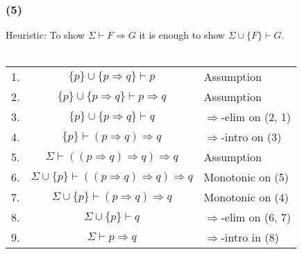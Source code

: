 \documentclass{article}
\begin{document}
\subsubsection*{(5)}
Heuristic: To show $\Sigma\vdash F\Rightarrow G$ it is enough to show $\Sigma\cup\{F\}\vdash G$.\\
\\
\begin{tabular}{r c l}
    1. & $\{p\}\cup \{p\Rightarrow q\}\vdash p$ & Assumption\\
    2. & $\{p\}\cup \{p\Rightarrow q\}\vdash p\Rightarrow q$ & Assumption\\
    3. & $\{p\}\cup \{p\Rightarrow q\}\vdash q$ & $\Rightarrow$-elim on (2, 1)\\
    4. & $\{p\}\vdash (p\Rightarrow q)\Rightarrow q$ & $\Rightarrow$-intro on (3)\\
    5. & $\Sigma\vdash ((p\Rightarrow q)\Rightarrow q)\Rightarrow q$ & Assumption\\
    6. & $\Sigma\cup\{p\}\vdash ((p\Rightarrow q)\Rightarrow q)\Rightarrow q$ & Monotonic on (5)\\
    7. & $\Sigma\cup\{p\}\vdash (p\Rightarrow q)\Rightarrow q$ & Monotonic on (4)\\
    8. & $\Sigma\cup\{p\}\vdash q$ & $\Rightarrow$-elim on (6, 7)\\
    9. & $\Sigma\vdash p\Rightarrow q$ & $\Rightarrow$-intro in (8)\\
\end{tabular}
\end{document}
